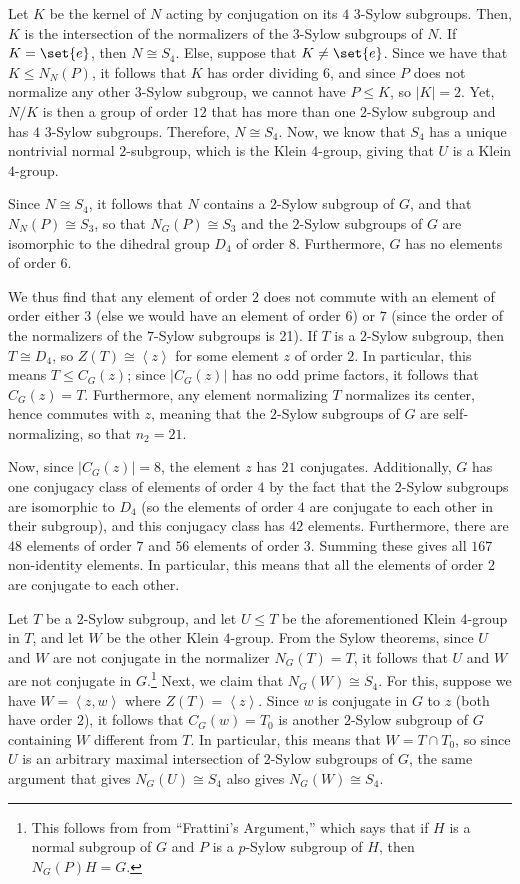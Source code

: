 \documentclass[10pt]{mypackage}
\begin{document}
Let $K$ be the kernel of $N$ acting by conjugation on its $4$ $3$-Sylow subgroups. Then, $K$ is the intersection of the normalizers of the $3$-Sylow subgroups of $N$. If $K = \set{e}$, then $N\cong S_4$. Else, suppose that $K\neq \set{e}$. Since we have that $K \leq N_N(P)$, it follows that $K$ has order dividing $6$, and since $P$ does not normalize any other $3$-Sylow subgroup, we cannot have $P\leq K$, so $\left\vert K \right\vert = 2$. Yet, $N/K$ is then a group of order $12$ that has more than one $2$-Sylow subgroup and has $4$ $3$-Sylow subgroups. Therefore, $N\cong S_4$. Now, we know that $S_4$ has a unique nontrivial normal $2$-subgroup, which is the Klein $4$-group, giving that $U$ is a Klein $4$-group.

Since $N\cong S_4$, it follows that $N$ contains a $2$-Sylow subgroup of $G$, and that $N_N(P)\cong S_3$, so that $N_G(P)\cong S_3$ and the $2$-Sylow subgroups of $G$ are isomorphic to the dihedral group $D_4$ of order $8$. Furthermore, $G$ has no elements of order $6$.

We thus find that any element of order $2$ does not commute with an element of order either $3$ (else we would have an element of order 6) or $7$ (since the order of the normalizers of the $7$-Sylow subgroups is 21). If $T$ is a $2$-Sylow subgroup, then $T\cong D_4$, so $Z(T)\cong \left\langle z \right\rangle$ for some element $z$ of order $2$. In particular, this means $T\leq C_G(z)$; since $\left\vert C_G(z) \right\vert$ has no odd prime factors, it follows that $C_G(z) = T$. Furthermore, any element normalizing $T$ normalizes its center, hence commutes with $z$, meaning that the $2$-Sylow subgroups of $G$ are self-normalizing, so that $n_2 = 21$.

Now, since $\left\vert C_G(z) \right\vert = 8$, the element $z$ has $21$ conjugates. Additionally, $G$ has one conjugacy class of elements of order $4$ by the fact that the $2$-Sylow subgroups are isomorphic to $D_4$ (so the elements of order $4$ are conjugate to each other in their subgroup), and this conjugacy class has $42$ elements. Furthermore, there are $48$ elements of order $7$ and $56$ elements of order $3$. Summing these gives all $167$ non-identity elements. In particular, this means that all the elements of order $2$ are conjugate to each other.

Let $T$ be a $2$-Sylow subgroup, and let $U\leq T$ be the aforementioned Klein $4$-group in $T$, and let $W$ be the other Klein $4$-group. From the Sylow theorems, since $U$ and $W$ are not conjugate in the normalizer $N_G(T) = T$, it follows that $U$ and $W$ are not conjugate in $G$.\footnote{This follows from from ``Frattini's Argument,'' which says that if $H$ is a normal subgroup of $G$ and $P$ is a $p$-Sylow subgroup of $H$, then $N_G(P)H = G$.} Next, we claim that $N_G(W) \cong S_4$. For this, suppose we have $W = \left\langle z,w \right\rangle$ where $ Z(T) = \left\langle z \right\rangle $. Since $w$ is conjugate in $G$ to $z$ (both have order $2$), it follows that $C_G(w) = T_0$ is another $2$-Sylow subgroup of $G$ containing $W$ different from $T$. In particular, this means that $W = T\cap T_0$, so since $U$ is an arbitrary maximal intersection of $2$-Sylow subgroups of $G$, the same argument that gives $N_G(U)\cong S_4$ also gives $N_G(W)\cong S_4$.
\end{document}
